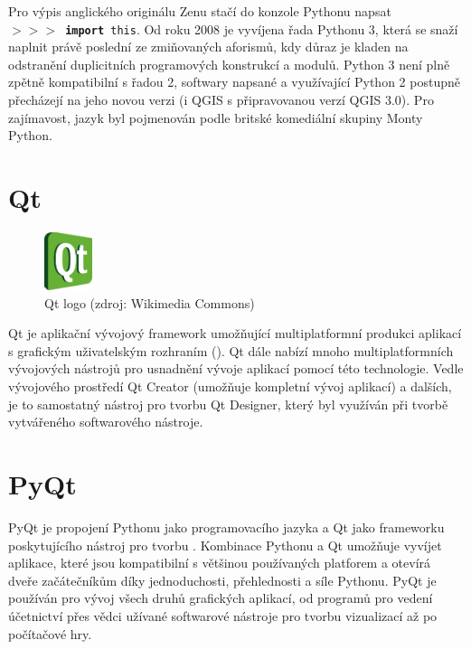 Pro výpis anglického originálu Zenu stačí do konzole Pythonu napsat \\ \texttt{$>>>$~\textbf{import}~this}. Od roku 2008 je vyvíjena řada Pythonu 3, která se snaží naplnit právě poslední ze zmiňovaných aforismů, kdy důraz je kladen na odstranění duplicitních programových konstrukcí a modulů. Python 3 není plně zpětně kompatibilní s řadou 2, softwary napsané a využívající Python 2 postupně přecházejí na jeho novou verzi (i QGIS s připravovanou verzí QGIS 3.0). Pro zajímavost, jazyk byl pojmenován podle britské komediální skupiny Monty Python.  %

\section{Qt}

\begin{figure}[H]
    \centering
      \includegraphics[width=40pt]{./pictures/qt.png}
      \caption[Qt logo]{Qt logo (zdroj: Wikimedia Commons)}
      \label{fig:python}
\end{figure}

Qt je aplikační vývojový framework umožňující multiplatformní produkci aplikací s grafickým uživatelským rozhraním (). Qt dále nabízí mnoho multiplatformních vývojových nástrojů pro usnadnění vývoje aplikací pomocí této technologie. Vedle vývojového prostředí Qt Creator (umožňuje kompletní vývoj aplikací) a dalších, je to samostatný nástroj pro tvorbu  Qt Designer, který byl využíván při tvorbě vytvářeného softwarového nástroje. %

\section{PyQt}
PyQt je propojení Pythonu jako programovacího jazyka a Qt jako frameworku poskytujícího nástroj pro tvorbu . Kombinace Pythonu a Qt umožňuje vyvíjet aplikace, které jsou kompatibilní s většinou používaných platforem a otevírá dveře začátečníkům díky jednoduchosti, přehlednosti a síle Pythonu. PyQt je používán pro vývoj všech druhů grafických aplikací, od programů pro vedení účetnictví přes vědci užívané softwarové nástroje pro tvorbu vizualizací až po počítačové hry.

